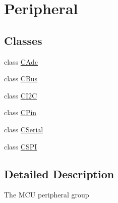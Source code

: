 \hypertarget{group___peripheral}{\section{Peripheral}
\label{group___peripheral}
}
\subsection*{Classes}
\begin{DoxyCompactItemize}
\item 
class \hyperlink{class_c_adc}{C\-Adc}
\item 
class \hyperlink{class_c_bus}{C\-Bus}
\item 
class \hyperlink{class_c_i2_c}{C\-I2\-C}
\item 
class \hyperlink{class_c_pin}{C\-Pin}
\item 
class \hyperlink{class_c_serial}{C\-Serial}
\item 
class \hyperlink{class_c_s_p_i}{C\-S\-P\-I}
\end{DoxyCompactItemize}


\subsection{Detailed Description}
The M\-C\-U peripheral group 